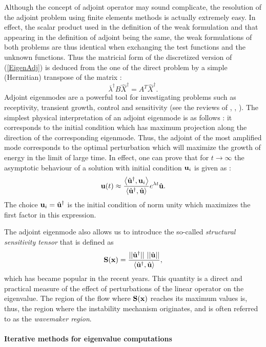 \documentclass[twocolumn,10pt]{asme2ej}
\newcommand{\be}[1]{ \begin{equation} \label{#1}}
\newcommand{\ee}{\end{equation}}
\begin{document}
Although the concept of adjoint operator may sound complicate, the resolution of the adjoint problem using finite elements methods is actually extremely easy. In effect, the scalar product used in the definition of the weak formulation and that appearing in the definition of adjoint being the same, the weak formulations of both problems are thus identical when exchanging the test functions and the unknown functions. Thus the matricial form of the discretized version of (\ref{EigenAdj}) is deduced from the one of the direct problem by a simple (Hermitian) transpose of the matrix :
\be{Eigen_Adj_matricial}
\overline{\lambda}^\dag B \hat{X}^\dag = A^T \hat{X}^\dag.
\ee
Adjoint eigenmodes are a powerful tool for investigating problems such as receptivity, transient growth, control and sensitivity (see the reviews of \cite{Jmc2005}, \cite{Ps2007}, \cite{LucBott2014}). The simplest physical interpretation of an adjoint eigenmode is as follows : it corresponds to the initial condition which has maximum projection along the direction of the corresponding eigenmode.
Thus, the adjoint of the most amplified mode corresponds to the optimal perturbation which will maximize the growth of energy in the limit of large time. In effect, one can prove that for $t \rightarrow \infty$  the asymptotic behaviour of a solution with initial condition ${\bf u}_i$  is given as :
$$
{\bf u}(t) \approx 
\frac{ \left< \hat{\bf u}^\dag, {\bf u}_i\right>}{\left<\hat{\bf u}^\dag, \hat{\bf u}\right>} 
e^{\lambda t} \hat{\bf u}.
$$
The choice ${\bf u}_i = \hat{\bf u}^\dag$ is the initial condition of norm unity which maximizes the first factor in this expression.

The adjoint eigenmode also allows us to introduce the so-called {\em structural sensitivity tensor } that is defined as 
\be{Structursens} 
{\bf{S}}({\bf{x}}) = \frac{|| \hat{\bf u}^\dag|| \,\, ||\hat{\bf u}|| }{{\left<\hat{\bf u}^\dag, \hat{\bf u}\right>}},
\ee 
which has became popular in the recent years.
This quantity is a direct and practical measure of the effect of perturbations of the linear operator on the eigenvalue. The region of the flow where ${\bf{S}}({\bf{x}})$ reaches its maximum values is, thus, the region where the instability mechanism originates, and is often referred to as the {\em wavemaker region}.


\paragraph{Iterative methods for eigenvalue computations}
\end{document}
